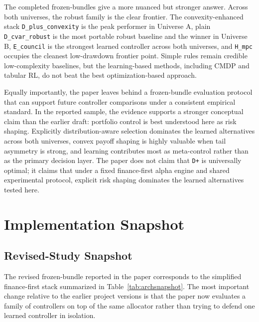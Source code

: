 \documentclass[10pt,twocolumn]{article}
\begin{document}
The completed frozen-bundles give a more nuanced but stronger answer. Across
both universes, the robust family is the clear frontier. The
convexity-enhanced stack \texttt{D\_plus\_convexity} is the peak performer in
Universe A, plain \texttt{D\_cvar\_robust} is the most portable robust baseline
and the winner in Universe B, \texttt{E\_council} is the strongest learned
controller across both universes, and \texttt{H\_mpc} occupies the cleanest
low-drawdown frontier point. Simple rules remain credible low-complexity
baselines, but the learning-based methods, including CMDP and tabular RL, do
not beat the best optimization-based approach.

Equally importantly, the paper leaves behind a frozen-bundle evaluation
protocol that can support future controller comparisons under a consistent
empirical standard. In the reported sample, the evidence supports a stronger
conceptual claim than the earlier draft: portfolio control is best understood
here as risk shaping. Explicitly distribution-aware selection dominates the
learned alternatives across both universes, convex payoff shaping is highly
valuable when tail asymmetry is strong, and learning contributes most as
meta-control rather than as the primary decision layer. The paper does not
claim that \texttt{D+} is universally optimal; it claims that under a fixed
finance-first alpha engine and shared experimental protocol, explicit risk
shaping dominates the learned alternatives tested here.

\appendix

\section{Implementation Snapshot}

\subsection{Revised-Study Snapshot}

The revised frozen-bundle reported in the paper corresponds to the simplified
finance-first stack summarized in Table~\ref{tab:archsnapshot}. The most
important change relative to the earlier project versions is that the paper now
evaluates a family of controllers on top of the same allocator rather than
trying to defend one learned controller in isolation.
\end{document}
